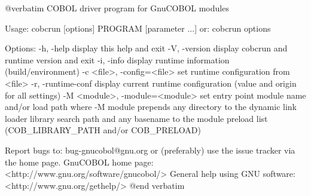@verbatim
COBOL driver program for GnuCOBOL modules

Usage: cobcrun [options] PROGRAM [parameter ...]
  or:  cobcrun options

Options:
  -h, -help                      display this help and exit
  -V, -version                   display cobcrun and runtime version and exit
  -i, -info                      display runtime information (build/environment)
  -c <file>, -config=<file>      set runtime configuration from <file>
  -r, -runtime-conf              display current runtime configuration
                                 (value and origin for all settings)
  -M <module>, -module=<module>  set entry point module name and/or load path
                                 where -M module prepends any directory to the
                                 dynamic link loader library search path
                                 and any basename to the module preload list
                                 (COB_LIBRARY_PATH and/or COB_PRELOAD)

Report bugs to: bug-gnucobol@gnu.org
or (preferably) use the issue tracker via the home page.
GnuCOBOL home page: <http://www.gnu.org/software/gnucobol/>
General help using GNU software: <http://www.gnu.org/gethelp/>
@end verbatim

